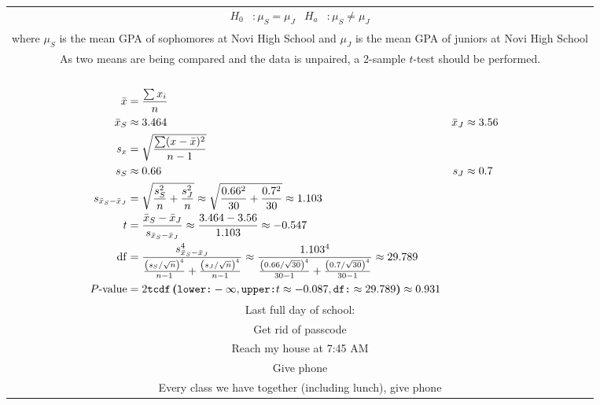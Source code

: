 \documentclass[margin = 5mm]{standalone}
\DeclareMathOperator{\df}{\mathrm{df}}
\newcommand{\tCDF}[3]{\texttt{tcdf}\bm{\left(}\texttt{lower:} #1, \texttt{upper:} #2, \texttt{df:} #3\bm{\right)}}
\newcommand{\pval}{P\text{-value}}
\begin{document}
	\nopagecolor
	\begin{tabular}{c}
		$\begin{aligned}
			H_0 &: \mu_S = \mu_J &
				H_a &: \mu_S \ne \mu_J
		\end{aligned}$ \\
		where $\mu_S$ is the mean GPA of sophomores at Novi High School and $\mu_J$ is the mean GPA of juniors at Novi High School \\
		As two means are being compared and the data is unpaired, a 2-sample $t$-test should be performed. \\
		$\begin{aligned} \\
			\bar{x} &= \frac{\sum x_i}{n}\\
			\bar{x}_S &\approx 3.464 &
				\bar{x}_J &\approx 3.56 \\
			s_x &= \sqrt{\frac{\sum(x - \bar{x})^2}{n - 1}} \\
			s_S &\approx 0.66 &
				s_J &\approx 0.7 \\
			s_{\bar{x}_S - \bar{x}_J} &= \sqrt{\frac{s_S^2}{n} + \frac{s_J^2}{n}} 
					\approx \sqrt{\frac{0.66^2}{30} + \frac{0.7^2}{30}} \approx  1.103 \\
			t &= \frac{\bar{x}_S - \bar{x}_J}{s_{\bar{x}_S - \bar{x}_J}} 
					\approx \frac{3.464 - 3.56}{1.103} 
					\approx -0.547 \\
			\df &= \frac{s_{\bar{x}_S - \bar{x}_J}^4}{\frac{\left(s_S/\sqrt{n}\right)^4}{n - 1} + \frac{\left(s_J/\sqrt{n}\right)^4}{n - 1}} 
			\approx \frac{1.103^4}{\frac{\left(0.66/\sqrt{30}\right)^4}{30 - 1} + \frac{\left(0.7/\sqrt{30}\right)^4}{30 - 1}} \approx 29.789 \\
			\pval &= 2\tCDF{-\infty}{t \approx -0.087}{\approx 29.789} \approx 0.931
		\end{aligned}$
		\\
		Last full day of school: \\
		Get rid of passcode
		\\
		Reach my house at 7:45 AM \\
		Give phone \\
		Every class we have together (including lunch), give phone
	\end{tabular}
\end{document}
